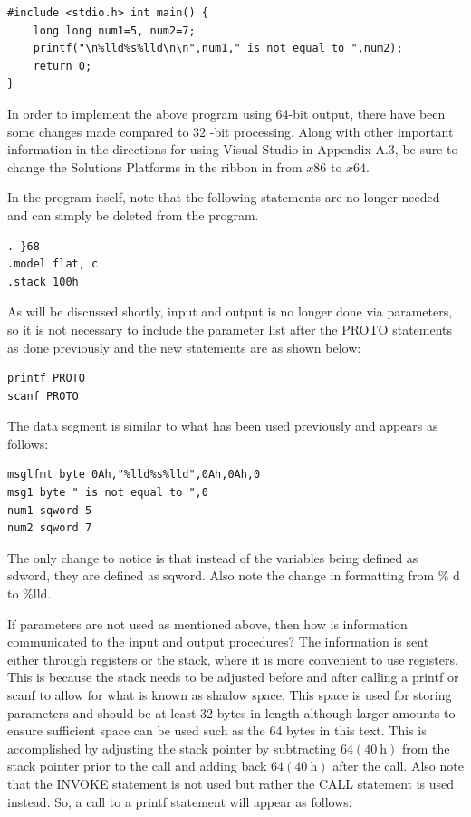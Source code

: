 \documentclass[10pt]{book}
\begin{document}
\begin{verbatim}
#include <stdio.h> int main() {
    long long num1=5, num2=7;
    printf("\n%lld%s%lld\n\n",num1," is not equal to ",num2);
    return 0;
}
\end{verbatim}

In order to implement the above program using 64-bit output, there have been some changes made compared to 32 -bit processing. Along with other important information in the directions for using Visual Studio in Appendix A.3, be sure to change the Solutions Platforms in the ribbon in from $x 86$ to $x 64$.

In the program itself, note that the following statements are no longer needed and can simply be deleted from the program.

\begin{verbatim}
. }68
.model flat, c
.stack 100h
\end{verbatim}

As will be discussed shortly, input and output is no longer done via parameters, so it is not necessary to include the parameter list after the PROTO statements as done previously and the new statements are as shown below:

\begin{verbatim}
printf PROTO
scanf PROTO
\end{verbatim}

The data segment is similar to what has been used previously and appears as follows:

\begin{verbatim}
msglfmt byte 0Ah,"%lld%s%lld",0Ah,0Ah,0
msg1 byte " is not equal to ",0
num1 sqword 5
num2 sqword 7
\end{verbatim}

The only change to notice is that instead of the variables being defined as sdword, they are defined as sqword. Also note the change in formatting from \% d to \%lld.

If parameters are not used as mentioned above, then how is information communicated to the input and output procedures? The information is sent either through registers or the stack, where it is more convenient to use registers. This is because the stack needs to be adjusted before and after calling a printf or scanf to allow for what is known as shadow space. This space is used for storing parameters and should be at least 32 bytes in length although larger amounts to ensure sufficient space can be used such as the 64 bytes in this text. This is accomplished by adjusting the stack pointer by subtracting $64(40 \mathrm{~h})$ from the stack pointer prior to the call and adding back $64(40 \mathrm{~h})$ after the call. Also note that the INVOKE statement is not used but rather the CALL statement is used instead. So, a call to a printf statement will appear as follows:
\end{document}
